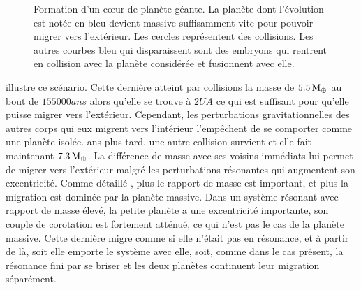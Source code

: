 \begin{figure}[htbp]
\centering
{}\hfill
{}
\caption{Formation d'un cœur de planète géante. La planète dont l'évolution est notée en bleu devient massive suffisamment vite pour pouvoir migrer vers l'extérieur. Les cercles représentent des collisions. Les autres courbes bleu qui disparaissent sont des embryons qui rentrent en collision avec la planète considérée et fusionnent avec elle. }%
\end{figure}

 illustre ce scénario. Cette dernière atteint par collisions la masse de $5.5\mathrm{\thinspace M_\oplus}$ au bout de $155 000\unit{ans}$ alors qu'elle se trouve à $2\unit{UA}$ ce qui est suffisant pour qu'elle puisse migrer vers l'extérieur. Cependant, les perturbations gravitationnelles des autres corps qui eux migrent vers l'intérieur l'empêchent de se comporter comme une planète isolée.  ans plus tard, une autre collision survient et elle fait maintenant $7.3\mathrm{\thinspace M_\oplus}$. La différence de masse avec ses voisins immédiats lui permet de migrer vers l'extérieur malgré les perturbations résonantes qui augmentent son excentricité. Comme détaillé , plus le rapport de masse est important, et plus la migration est dominée par la planète massive. Dans un système résonant avec rapport de masse élevé, la petite planète a une excentricité importante, son couple de corotation est fortement atténué, ce qui n'est pas le cas de la planète 
massive. Cette dernière migre comme si elle n'était pas en résonance, et à partir de là, soit elle emporte le système avec elle, soit, comme dans le cas présent, la résonance fini par se briser et les deux planètes continuent leur migration séparément.

